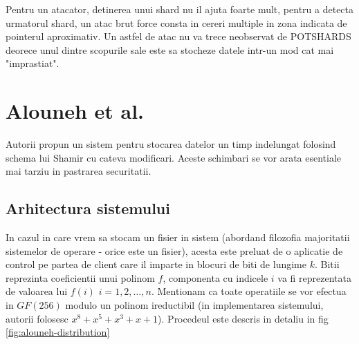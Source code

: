\documentclass{llncs}
\begin{document}
Pentru un atacator, detinerea unui shard nu il ajuta foarte mult, pentru a detecta urmatorul shard, un atac brut force consta in cereri multiple in zona indicata de pointerul aproximativ. Un astfel de atac nu va trece neobservat de POTSHARDS deorece unul dintre scopurile sale este sa stocheze datele intr-un mod cat mai "imprastiat".\cite{SGMV:2009}

\section{Alouneh et al.}


Autorii propun un sistem pentru stocarea datelor un timp indelungat folosind schema lui Shamir cu cateva modificari. Aceste schimbari se vor arata esentiale mai tarziu in pastrarea securitatii.

\subsection{Arhitectura sistemului}
In cazul in care vrem sa stocam un fisier in sistem (abordand filozofia majoritatii sistemelor de operare - orice este un fisier), acesta este preluat de o aplicatie de control pe partea de client care il imparte in blocuri de biti de lungime $k$. Bitii reprezinta coeficientii unui polinom $f$, componenta cu indicele $i$ va fi reprezentata de valoarea lui $f(i)$ $i = 1,2,\dots, n$. Mentionam ca toate operatiile se vor efectua in $GF(256)$ modulo un polinom ireductibil (in implementarea sistemului, autorii folosesc $x^8 + x^5 + x^3 + x + 1$). Procedeul este descris in detaliu in fig \ref{fig:alouneh-distribution}
\end{document}
